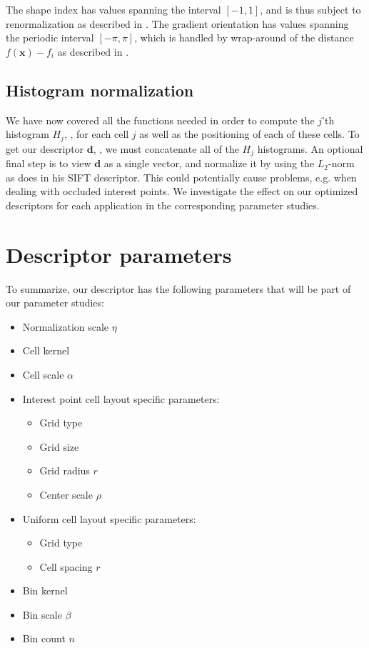 \documentclass[thesis.tex]{subfiles}
\def\x{\mathbf{x}}
\def\d{\mathbf{d}}
\begin{document}
The shape index has values spanning the interval $[-1,1]$, and is thus subject to renormalization as described in . The gradient orientation has values spanning the periodic interval $[-\pi,\pi]$, which is handled by wrap-around of the distance $f(\x)-f_i$ as described in .
%
\subsection{Histogram normalization}
%
We have now covered all the functions needed in order to compute the $j$'th histogram $H_j$, , for each cell $j$ as well as the positioning of each of these cells. To get our descriptor $\d$, , we must concatenate all of the $H_j$ histograms. An optional final step is to view $\d$ as a single vector, and normalize it by using the $L_2$-norm as \citet{lowe2004distinctive} does in his SIFT descriptor. This could potentially cause problems, e.g. when dealing with occluded interest points. We investigate the effect on our optimized descriptors for each application in the corresponding parameter studies.
%
\section{Descriptor parameters}
\label{sec:descriptorParameters}
%
To summarize, our descriptor has the following parameters that will be part of our parameter studies:
%
\begin{itemize}
\itemsep0em
\item Normalization scale $\eta$
\item Cell kernel
\item Cell scale $\alpha$
\item Interest point cell layout specific parameters:
\begin{itemize}
\item Grid type
\item Grid size
\item Grid radius $r$ 
\item Center scale $\rho$
\end{itemize}
\item Uniform cell layout specific parameters:
\begin{itemize}
\item Grid type
\item Cell spacing $r$
\end{itemize}
\item Bin kernel
\item Bin scale $\beta$
\item Bin count $n$
\end{itemize}
%
\end{document}
